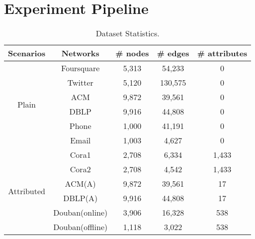 \section{Experiment Pipeline}\label{app:exp}
\vspace{-5pt}
\begin{table}[ht]
    \small
    \vspace{-5pt}
    \centering
    \caption{Dataset Statistics.}
    \vspace{-5pt}
    \begin{tabular}{ccccc}
        \toprule
        \textbf{Scenarios} & \textbf{Networks} & \textbf{\# nodes} & \textbf{\# edges} & \textbf{\# attributes} \\
        \midrule
        \multirow{6}{*}{Plain} & Foursquare & 5,313 & 54,233 & 0 \\
        & Twitter & 5,120 & 130,575 & 0 \\
        \cmidrule{2-5}
        & ACM & 9,872 & 39,561 & 0 \\
        & DBLP & 9,916 & 44,808 & 0 \\
        \cmidrule{2-5}
        & Phone & 1,000 & 41,191 & 0 \\
        & Email & 1,003 & 4,627 & 0 \\
        \midrule
        \multirow{6}{*}{Attributed} & Cora1 & 2,708 & 6,334 & 1,433 \\
        & Cora2 & 2,708 & 4,542 & 1,433 \\
        \cmidrule{2-5}
        & ACM(A) & 9,872 & 39,561 & 17 \\
        & DBLP(A) & 9,916 & 44,808 & 17 \\
        \cmidrule{2-5}
        & Douban(online) & 3,906 & 16,328 & 538 \\
        & Douban(offline) & 1,118 & 3,022 & 538 \\
        \bottomrule
    \end{tabular}
    \vspace{-5pt}
    \label{tab:datasets}
\end{table}

